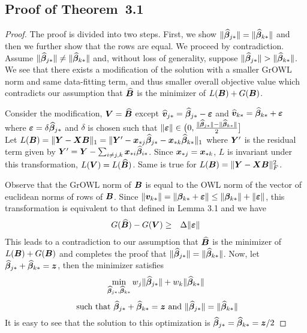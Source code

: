 \subsection*{Proof of Theorem~3.1}
\begin{proof}
The proof is divided into two steps. First, we show
$\|\widehat {\boldsymbol{\beta}}_{j {\ast}}\| = \|\widehat {\boldsymbol{\beta}}_{k {\ast}}\|$ and then we further show that the
rows are equal. We proceed by contradiction. Assume
$\|\widehat {\boldsymbol{\beta}}_{j {\ast}}\| \neq\|\widehat {\boldsymbol{\beta}}_{k {\ast}}\|$ and, without loss of
generality, suppose $\|\widehat {\boldsymbol{\beta}}_{j {\ast}}\| > \|\widehat {\boldsymbol{\beta}}_{k {\ast}}\|$. We see that
there exists a modification of the solution with a smaller GrOWL norm and same
data-fitting term, and thus smaller overall objective value which contradicts our
assumption that $\widehat {\boldsymbol{B}}$ is the minimizer of $L(\boldsymbol{B}) + G(\boldsymbol{B})$.

Consider the modification, $\boldsymbol{V} = \widehat {\boldsymbol{B}}$ except
$\widehat {\boldsymbol{v}}_{j {\ast}} = \widehat {\boldsymbol{\beta}}_{j {\ast}} - \boldsymbol{\varepsilon}$ and
$\widehat {\boldsymbol{v}}_{k {\ast}} = \widehat {\boldsymbol{\beta}}_{k {\ast}} + \boldsymbol{\varepsilon}$  where
$\boldsymbol{\varepsilon} = \delta \widehat {\boldsymbol{\beta}}_{j {\ast}}$ and $\delta$ is chosen such that
$ \| \boldsymbol{\varepsilon} \| \in \big (0, \frac{\|\widehat {\boldsymbol{\beta}}_{j {\ast}}\| - \| \widehat {\boldsymbol{\beta}}_{k {\ast}} \|}{2} \big ]$\\

Let
$L(\boldsymbol{B}) = \|\boldsymbol{Y} - \boldsymbol{X} \boldsymbol{B} \|_1 = \|\boldsymbol{Y}' - \boldsymbol{x}_{{\ast} j} \widehat {\boldsymbol{\beta}}_{j {\ast}} - \boldsymbol{x}_{{\ast} k} \widehat {\boldsymbol{\beta}}_{k {\ast}}\|_1$
where $\boldsymbol{Y}'$ is the residual term given by
$\boldsymbol{Y}' = \boldsymbol{Y} - \sum_{i \neq j, k} \boldsymbol{x}_{{\ast} i} \widehat {\boldsymbol{\beta}}_{i {\ast}}$. Since
$\boldsymbol{x}_{{\ast} j} = \boldsymbol{x}_{{\ast} k}$, $L$ is invariant under this transformation, \ie
$L(\boldsymbol{V}) = L(\widehat {\boldsymbol{B}}) $. Same is true for $L(\boldsymbol{B}) = \|\boldsymbol{Y} - \boldsymbol{X} \boldsymbol{B} \|_F^2$.

Observe that the GrOWL norm of $\boldsymbol{B}$ is equal to the OWL norm of the vector of euclidean
norms of rows of $\boldsymbol{B}$. Since $\| \boldsymbol{v}_{k {\ast}} \| = \| \boldsymbol{\beta}_{k {\ast}} + \boldsymbol{\varepsilon} \| \leq \|
\boldsymbol{\beta}_{k {\ast}} \| + \| \boldsymbol{\varepsilon} \|$, this transformation is equivalent to that defined in Lemma
3.1 and we have
\begin{eqnarray*}
 G(\widehat{\boldsymbol{B}}) - G(\boldsymbol{V}) & \geq & \Delta \|\boldsymbol{\varepsilon}\|
\end{eqnarray*}
This leads to a contradiction to our assumption that $\widehat {\boldsymbol{B}}$ is the minimizer of
$L(\boldsymbol{B}) + G(\boldsymbol{B})$ and completes the proof that $\|\widehat {\boldsymbol{\beta}}_{j {\ast}}\| = \|\widehat
{\boldsymbol{\beta}}_{k {\ast}}\|$.
Now, let $\widehat {\boldsymbol{\beta}}_{j {\ast}} + \widehat {\boldsymbol{\beta}}_{k {\ast}} = \boldsymbol{z}$, then the minimizer
satisfies
$$\min_{\widehat {\boldsymbol{\beta}}_{j {\ast}}, \widehat {\boldsymbol{\beta}}_{k {\ast}}} w_j\|\widehat {\boldsymbol{\beta}}_{j {\ast}}\| + w_k \|\widehat {\boldsymbol{\beta}}_{k {\ast}}\| $$
$$\textnormal{ such that } \widehat {\boldsymbol{\beta}}_{j {\ast}} + \widehat {\boldsymbol{\beta}}_{k {\ast}} = \boldsymbol{z} \textnormal{ and } \|\widehat {\boldsymbol{\beta}}_{j {\ast}}\| = \|\widehat {\boldsymbol{\beta}}_{k {\ast}}\| $$
It is easy to see that the solution to this optimization is
$\widehat {\boldsymbol{\beta}}_{j {\ast}} = \widehat {\boldsymbol{\beta}}_{k {\ast}} = \boldsymbol{z}/2$
\end{proof}

